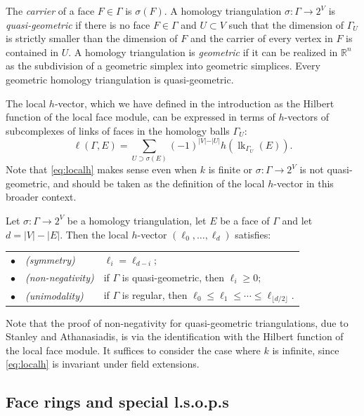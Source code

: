 \documentclass[ALCO, Unicode,published]{cedram}
\def\R{\mathbb{R}}
\DeclareMathOperator{\lk}{lk}
\begin{document}
The \emph{carrier} of a face $F \in \Gamma$ is $\sigma(F)$. A homology triangulation $\sigma\colon \Gamma \to 2^V$ is \emph{quasi-geometric} if there is no face $F \in \Gamma$ and $U \subset V$ such that the dimension of $\Gamma_U$ is strictly smaller than the dimension of $F$ and the carrier of every vertex in $F$ is contained in $U$.  A homology triangulation is \emph{geometric} if it can be realized in $\R^n$ as the subdivision of a geometric simplex into geometric simplices. Every geometric homology triangulation is quasi-geometric. 

The local $h$-vector, which we have defined in the introduction as the Hilbert function of the local face module, can be expressed in terms of $h$-vectors of subcomplexes of links of faces in the homology balls $\Gamma_U$:
\begin{equation} \label{eq:localh}
\ell(\Gamma, E) = \sum_{U \supset \sigma(E)} (-1)^{|V| - \vert U \vert} h(\lk_{\Gamma_U}(E)).
\end{equation}
Note that \eqref{eq:localh} makes sense even when $k$ is finite or $\sigma \colon \Gamma \to 2^V$ is not quasi-geometric, and should be taken as the definition of the local $h$-vector in this broader context. 


\begin{theorem}\label{t:localproperties}
Let $\sigma \colon \Gamma \to 2^V$ be a homology triangulation, let $E$ be a face of $\Gamma$ and let $d = |V| - |E|$.  Then the local $h$-vector $(\ell_0, \ldots, \ell_d)$ satisfies: \\
\begin{tabular}{lll}
\quad \quad $\bullet$ &  \emph{(symmetry)} &
$\ell_i = \ell_{d-i};$ \\
\quad \quad $\bullet$ & \emph{(non-negativity)} & if $\Gamma$ is quasi-geometric, then $\ell_i \geq 0;$\\
\quad \quad $\bullet$ & \emph{(unimodality)} &
 if $\Gamma$ is regular, then $\ell_0 \leq \ell_1 \leq \cdots \leq \ell_{\lfloor d/2 \rfloor}$.
\end{tabular}
\end{theorem}

Note that the proof of non-negativity for quasi-geometric triangulations, due to Stanley and Athanasiadis, is via the identification with the Hilbert function of the local face module. It suffices to consider the case where $k$ is infinite, since \eqref{eq:localh} is invariant under field extensions.


\subsection{Face rings and special l.s.o.p.s}\label{ss:sr}
\end{document}

